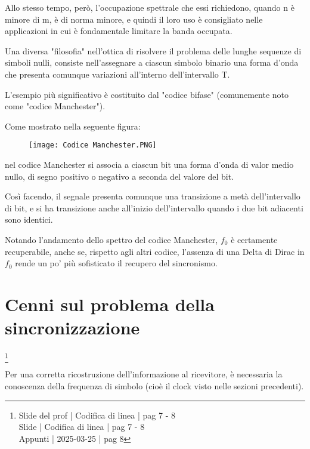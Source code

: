 Allo stesso tempo, però, l'occupazione spettrale che essi richiedono, quando n è minore di m, 
è di norma minore, e quindi il loro uso è consigliato nelle applicazioni in cui è fondamentale limitare la banda occupata. \newline 

Una diversa "filosofia" nell'ottica di risolvere il problema delle lunghe sequenze di simboli nulli, 
consiste nell'assegnare a ciascun simbolo binario una forma d'onda che presenta comunque variazioni all'interno dell'intervallo T. \newline 

L'esempio più significativo è costituito dal "codice bifase" (comunemente noto come "codice Manchester"). \newline 

\newpage 

Come mostrato nella seguente figura: 

\begin{figure}[h]
    \centering
    \texttt{[image: Codice Manchester.PNG]}
\end{figure} 

nel codice Manchester si associa a ciascun bit una forma d'onda di valor medio nullo, di segno positivo o negativo a seconda del valore del bit. \newline 

Così facendo, il segnale presenta comunque una transizione a metà dell'intervallo di bit, e si ha transizione anche all'inizio dell'intervallo quando i due bit adiacenti sono identici. \newline 

Notando l'andamento dello spettro del codice Manchester, $f_0$ è certamente recuperabile, anche se, 
rispetto agli altri codice, l'assenza di una Delta di Dirac in $f_0$ rende un po' più sofisticato il recupero del sincronismo. \newline 

\newpage 

\section{Cenni sul problema della sincronizzazione}
\footnote{Slide del prof | Codifica di linea | pag 7 - 8\\
Slide | Codifica di linea | pag  7 - 8\\  
Appunti | 2025-03-25 | pag 8 
}

Per una corretta ricostruzione dell'informazione al ricevitore, 
è necessaria la conoscenza della frequenza di simbolo (cioè il clock visto nelle sezioni precedenti). \newline 

